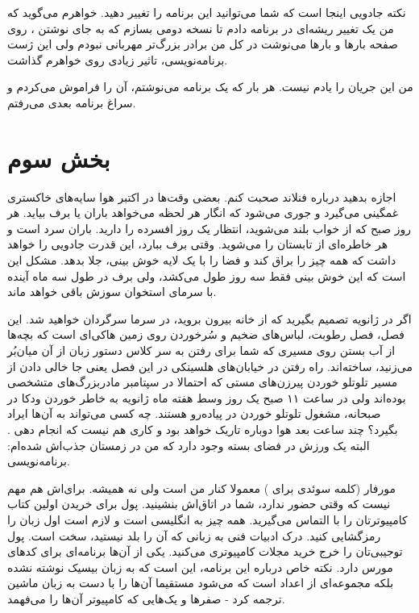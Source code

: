 نکته جادویی اینجا است که شما می‌توانید این برنامه را تغییر دهید. خواهرم
می‌گوید که من یک تغییر ریشه‌ای در برنامه دادم تا نسخه دومی بسازم که به
جای نوشتن ، روی صفحه بارها و بارها می‌نوشت  در کل من برادر بزرگ‌تر مهربانی نبودم ولی این ژست
برنامه‌نویسی، تاثیر زیادی روی خواهرم گذاشت.

من این جریان را یادم نیست. هر بار که یک برنامه می‌نوشتم، آن را فراموش
می‌کردم و سراغ برنامه بعدی می‌رفتم.

\section{بخش سوم}

اجازه بدهید درباره فنلاند صحبت کنم. بعضی وقت‌ها در
اکتبر هوا سایه‌های خاکستری غمگینی می‌گیرد و جوری
می‌شود که انگار هر لحظه می‌خواهد باران یا برف بیاید. هر روز صبح که از
خواب بلند می‌شوید، انتظار یک روز افسرده را دارید. باران سرد است و هر
خاطره‌ای از تابستان را می‌شوید. وقتی برف ببارد، این قدرت جادویی را خواهد
داشت که همه چیز را براق کند و فضا را با یک لایه خوش بینی، جلا
بدهد. مشکل این است که این خوش بینی فقط سه روز طول می‌کشد، ولی برف در
طول سه ماه آینده با سرمای استخوان سوزش باقی خواهد ماند.

اگر در ژانویه تصمیم بگیرید که از خانه بیرون بروید،
در سرما سرگردان خواهید شد. این فصل، فصل رطوبت، لباس‌های ضخیم و سُرخوردن
روی زمین هاکی‌ای است که بچه‌ها از آب بستن روی مسیری که شما برای رفتن به
سر کلاس دستور زبان از آن میان‌بُر می‌زنید، ساخته‌اند. راه رفتن در
خیابان‌های هلسینکی در این فصل یعنی جا خالی دادن از مسیر تلوتلو خوردن
پیرزن‌های مستی که احتمالا در سپتامبر
مادربزرگ‌های متشخصی بوده‌اند ولی در ساعت ۱۱ صبح یک روز وسط هفته ماه
ژانویه به خاطر خوردن ودکا در صبحانه، مشغول تلوتلو خوردن در پیاده‌رو
هستند. چه کسی می‌تواند به آن‌ها ایراد بگیرد؟‌ چند ساعت بعد هوا دوباره
تاریک خواهد بود و کاری هم نیست که انجام دهی . البته یک ورزش در فضای
بسته وجود دارد که من در زمستان جذب‌اش شده‌ام: برنامه‌نویسی.

مورفار (کلمه سوئدی برای )
معمولا کنار من است ولی نه همیشه. برای‌اش هم مهم نیست که وقتی حضور
ندارد، شما در اتاق‌اش بنشینید. پول برای خریدن اولین کتاب کامپیوترتان را
با التماس می‌گیرید. همه چیز به انگلیسی است و لازم است اول زبان را
رمزگشایی کنید. درک ادبیات فنی به زبانی که آن را بلد نیستید، سخت
است. پول توجیبی‌تان را خرج خرید مجلات کامپیوتری می‌کنید. یکی از آن‌ها
برنامه‌ای برای کدهای مورس دارد. نکته خاص درباره این برنامه، این است که
به زبان بیسیک نوشته نشده بلکه مجموعه‌ای از اعداد است که می‌شود مستقیما
آن‌ها را با دست به زبان ماشین ترجمه کرد - صفرها و یک‌هایی که کامپیوتر
آن‌ها را می‌فهمد.

